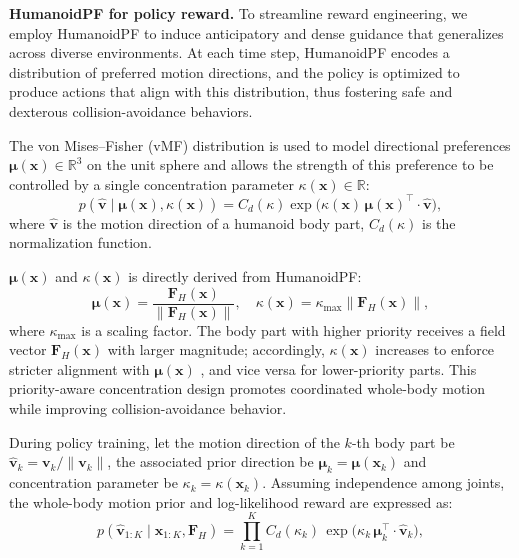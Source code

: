 \textbf{HumanoidPF for policy reward.}
To streamline reward engineering, we employ HumanoidPF to induce anticipatory and dense guidance that generalizes across diverse environments. At each time step, HumanoidPF encodes a distribution of preferred motion directions, and the policy is optimized to produce actions that align with this distribution, thus fostering safe and dexterous collision-avoidance behaviors.

The von Mises–Fisher (vMF) distribution is used to model directional preferences $\boldsymbol{\mu}(\mathbf{x}) \in \mathbb{R}^3$ on the unit sphere and allows the strength of this preference to be controlled by a single concentration parameter $\kappa(\mathbf{x}) \in \mathbb{R}$:
\begin{equation}
p(\hat{\mathbf{v}} \mid \boldsymbol{\mu}(\mathbf{x}), \kappa(\mathbf{x}))
= C_d(\kappa)\exp\!\big(\kappa(\mathbf{x})\, \boldsymbol{\mu}(\mathbf{x})^\top \cdot \hat{\mathbf{v}}\big),
\end{equation}
where $\hat{\mathbf{v}}$ is the motion direction of a humanoid body part, $C_d(\kappa)$ is the normalization function.  

$\boldsymbol{\mu}(\mathbf{x})$ and $\kappa(\mathbf{x})$ is directly derived from HumanoidPF:
\begin{equation}
\boldsymbol{\mu}(\mathbf{x}) = \frac{\mathbf{F}_H(\mathbf{x})}{\lVert \mathbf{F}_H(\mathbf{x}) \rVert}, \quad
\kappa(\mathbf{x}) = \kappa_{\max} \lVert \mathbf{F}_H(\mathbf{x}) \rVert,
\end{equation}
where $\kappa_{\max}$ is a scaling factor. The body part with higher priority receives a field vector $\mathbf{F}_H(\mathbf{x})$ with larger magnitude; accordingly, $\kappa(\mathbf{x})$ increases to enforce stricter alignment with $\boldsymbol{\mu}(\mathbf{x})$ , and vice versa for lower-priority parts. This priority-aware concentration design promotes coordinated whole-body motion while improving collision-avoidance behavior.

During policy training, let the motion direction of the $k$-th body part be $\hat{\mathbf{v}}_k = \mathbf{v}_k / \|\mathbf{v}_k\|$, the associated prior direction be $\boldsymbol{\mu}_k = \boldsymbol{\mu}(\mathbf{x}_k)$ and concentration parameter be $\kappa_k = \kappa(\mathbf{x}_k)$. 
Assuming independence among joints, the whole-body motion prior and log-likelihood reward are expressed as:
\begin{equation}
p(\hat{\mathbf{v}}_{1:K} \mid \mathbf{x}_{1:K}, \mathbf{F}_H)
= \prod_{k=1}^{K}
C_d(\kappa_k)\,
\exp\!\big(\kappa_k\,\boldsymbol{\mu}_k^\top \cdot \hat{\mathbf{v}}_k\big),
\end{equation}

